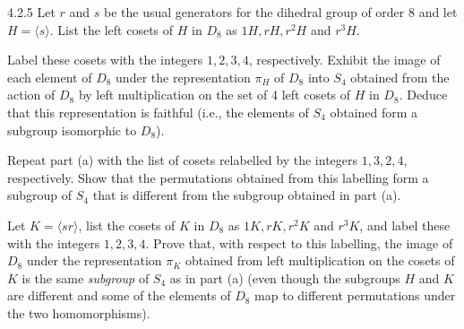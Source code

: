 \begin{exercise}{4.2.5}
	Let $r$ and $s$ be the usual generators for the dihedral group of order 8 and let $H = \langle s \rangle$.
	List the left cosets of $H$ in $D_8$ as $1H, rH, r^2H$ and $r^3H$.
	\begin{subexercises}
		\item Label these cosets with the integers $1,2,3,4$, respectively.
		Exhibit the image of each element of $D_8$ under the representation $\pi_H$ of $D_8$ into $S_4$ obtained from the action of $D_8$ by left multiplication on the set of 4 left cosets of $H$ in $D_8$.
		Deduce that this representation is faithful (i.e., the elements of $S_4$ obtained form a subgroup isomorphic to $D_8$).
		\item Repeat part (a) with the list of cosets relabelled by the integers $1,3,2,4$, respectively.
		Show that the permutations obtained from this labelling form a subgroup of $S_4$ that is different from the subgroup obtained in part (a).
		\item Let $K = \langle sr \rangle$, list the cosets of $K$ in $D_8$ as $1K, rK, r^2K$ and $r^3K$, and label these with the integers $1,2,3,4$.
		Prove that, with respect to this labelling, the image of $D_8$ under the representation $\pi_K$ obtained from left multiplication on the cosets of $K$ is the same \emph{subgroup} of $S_4$ as in part (a) (even though the subgroups $H$ and $K$ are different and some of the elements of $D_8$ map to different permutations under the two homomorphisms).
	\end{subexercises}
\end{exercise}

